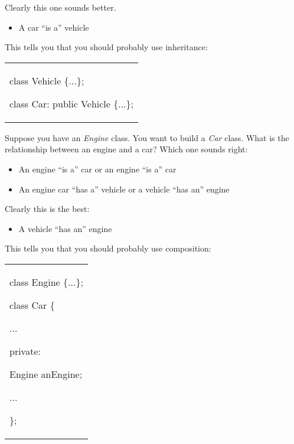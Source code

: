 \documentclass[
]{article}
\providecommand{\tightlist}{%
  \setlength{\itemsep}{0pt}\setlength{\parskip}{0pt}}
\begin{document}
Clearly this one sounds better.

\begin{itemize}
\tightlist
\item
  A car ``is a'' vehicle
\end{itemize}

This tells you that you should probably use inheritance:

\begin{longtable}[]{@{}
  >{\raggedright\arraybackslash}p{}@{}}
\toprule\noalign{}
 \\
\midrule\noalign{}
\endhead
\bottomrule\noalign{}
\endlastfoot
class Vehicle \{...\};

class Car: public Vehicle \{...\}; \\
\end{longtable}

Suppose you have an \emph{Engine} class. You want to build a \emph{Car}
class. What is the relationship between an engine and a car? Which one
sounds right:

\begin{itemize}
\tightlist
\item
  An engine ``is a'' car or an engine ``is a'' car
\item
  An engine car ``has a'' vehicle or a vehicle ``has an'' engine
\end{itemize}

Clearly this is the best:

\begin{itemize}
\tightlist
\item
  A vehicle ``has an'' engine
\end{itemize}

This tells you that you should probably use composition:

\begin{longtable}[]{@{}
  >{\raggedright\arraybackslash}p{}@{}}
\toprule\noalign{}
 \\
\midrule\noalign{}
\endhead
\bottomrule\noalign{}
\endlastfoot
class Engine \{...\};

class Car \{

...

private:

Engine anEngine;

...

\}; \\
\end{longtable}
\end{document}
